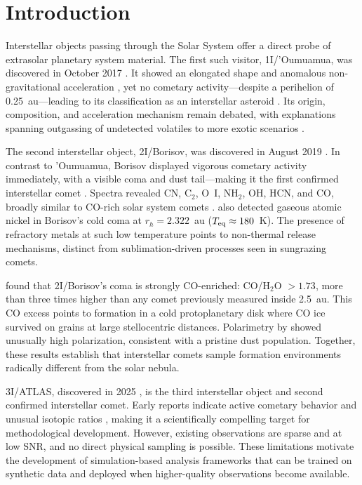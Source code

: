 \documentclass[preprint2]{aastex631}
\begin{document}

\section{Introduction}\label{sec:intro}

Interstellar objects passing through the Solar System offer a direct probe of extrasolar planetary system material. The first such visitor, 1I/'Oumuamua, was discovered in October 2017 \citep{meech17}. It showed an elongated shape and anomalous non-gravitational acceleration \citep{micheli18}, yet no cometary activity---despite a perihelion of 0.25~au---leading to its classification as an interstellar asteroid \citep{jewitt17}. Its origin, composition, and acceleration mechanism remain debated, with explanations spanning outgassing of undetected volatiles \citep{seligman23} to more exotic scenarios \citep{loeb18}.

The second interstellar object, 2I/Borisov, was discovered in August 2019 \citep{guzik19}. In contrast to 'Oumuamua, Borisov displayed vigorous cometary activity immediately, with a visible coma and dust tail---making it the first confirmed interstellar comet \citep{jewitt19}. Spectra revealed CN, C$_{2}$, O~I, NH$_{2}$, OH, HCN, and CO, broadly similar to CO-rich solar system comets \citep{fitzsimmons19,bodewits20}. \citet{guzik21} also detected gaseous atomic nickel in Borisov's cold coma at $r_h = 2.322$~au ($T_{\rm eq} \approx 180$~K). The presence of refractory metals at such low temperature points to non-thermal release mechanisms, distinct from sublimation-driven processes seen in sungrazing comets.

\citet{bodewits20} found that 2I/Borisov's coma is strongly CO-enriched: CO/H$_{2}$O $> 1.73$, more than three times higher than any comet previously measured inside 2.5~au. This CO excess points to formation in a cold protoplanetary disk where CO ice survived on grains at large stellocentric distances. Polarimetry by \citet{bagnulo22} showed unusually high polarization, consistent with a pristine dust population. Together, these results establish that interstellar comets sample formation environments radically different from the solar nebula.

3I/ATLAS, discovered in 2025 \citep{atlas25}, is the third interstellar object and second confirmed interstellar comet. Early reports indicate active cometary behavior \citep{pratik26} and unusual isotopic ratios \citep{opitom26}, making it a scientifically compelling target for methodological development. However, existing observations are sparse and at low SNR, and no direct physical sampling is possible. These limitations motivate the development of simulation-based analysis frameworks that can be trained on synthetic data and deployed when higher-quality observations become available.
\end{document}
